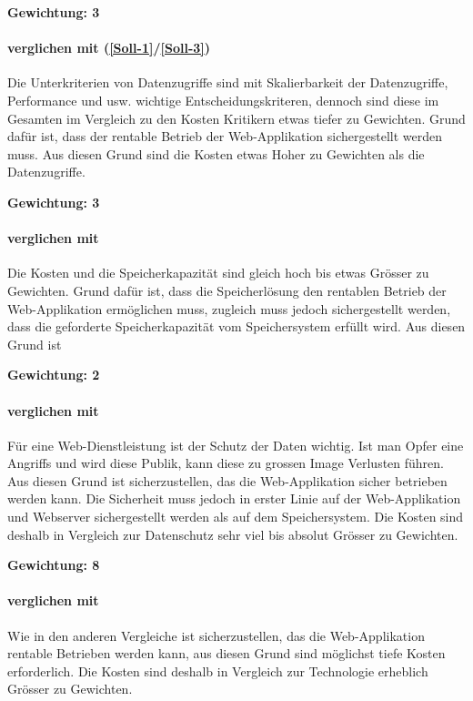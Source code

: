 \textbf{Gewichtung: 3}

\paragraph*{ verglichen mit  (\ref{Soll-1}/\ref{Soll-3})}
Die Unterkriterien von Datenzugriffe sind mit Skalierbarkeit der Datenzugriffe, Performance und usw. wichtige Entscheidungskriteren, dennoch sind diese im Gesamten im Vergleich zu den Kosten Kritikern etwas tiefer zu Gewichten. Grund dafür ist, dass der rentable Betrieb der Web-Applikation sichergestellt werden muss. Aus diesen Grund sind die Kosten etwas Hoher zu Gewichten als die Datenzugriffe.

\textbf{Gewichtung: 3}

\paragraph*{ verglichen mit }
Die Kosten und die Speicherkapazität sind gleich hoch bis etwas Grösser zu Gewichten. Grund dafür ist, dass die Speicherlösung den rentablen Betrieb der Web-Applikation ermöglichen muss, zugleich muss jedoch sichergestellt werden, dass die geforderte Speicherkapazität vom Speichersystem erfüllt wird. Aus diesen Grund ist

\textbf{Gewichtung: 2}

\paragraph*{ verglichen mit }
Für eine Web-Dienstleistung ist der Schutz der Daten wichtig. Ist man Opfer eine Angriffs und wird diese Publik, kann diese zu grossen Image Verlusten führen. Aus diesen Grund ist sicherzustellen, das die Web-Applikation sicher betrieben werden kann. Die Sicherheit muss jedoch in erster Linie auf der Web-Applikation und Webserver sichergestellt werden als auf dem Speichersystem. Die Kosten sind deshalb in Vergleich zur Datenschutz sehr viel  bis absolut Grösser zu Gewichten.

\textbf{Gewichtung: 8}

\paragraph*{ verglichen mit }
Wie in den anderen Vergleiche ist sicherzustellen, das die Web-Applikation rentable Betrieben werden kann, aus diesen Grund sind möglichst tiefe Kosten erforderlich. Die Kosten sind deshalb in Vergleich zur Technologie erheblich Grösser zu Gewichten.

